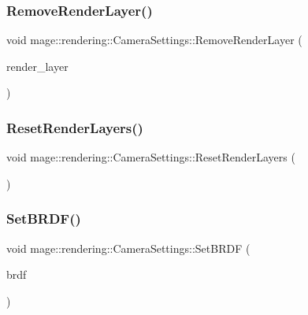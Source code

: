 \subsubsection{\texorpdfstring{Remove\+Render\+Layer()}{RemoveRenderLayer()}}
{\footnotesize\ttfamily void mage\+::rendering\+::\+Camera\+Settings\+::\+Remove\+Render\+Layer (\begin{DoxyParamCaption}\item[{\hyperlink{namespacemage_1_1rendering_a466c2a441ea5b26e4625c2f34e021b3d}{Render\+Layer}}]{render\+\_\+layer }\end{DoxyParamCaption})\hspace{0.3cm}{\ttfamily [noexcept]}}

\hypertarget{classmage_1_1rendering_1_1_camera_settings_a954a0af8d7939069e32b77abc23f95d0}{}\label{classmage_1_1rendering_1_1_camera_settings_a954a0af8d7939069e32b77abc23f95d0} 
\subsubsection{\texorpdfstring{Reset\+Render\+Layers()}{ResetRenderLayers()}}
{\footnotesize\ttfamily void mage\+::rendering\+::\+Camera\+Settings\+::\+Reset\+Render\+Layers (\begin{DoxyParamCaption}{ }\end{DoxyParamCaption})\hspace{0.3cm}{\ttfamily [noexcept]}}

\hypertarget{classmage_1_1rendering_1_1_camera_settings_af2af3e55e876b0e2b037904e221f0bc4}{}\label{classmage_1_1rendering_1_1_camera_settings_af2af3e55e876b0e2b037904e221f0bc4} 
\subsubsection{\texorpdfstring{Set\+B\+R\+D\+F()}{SetBRDF()}}
{\footnotesize\ttfamily void mage\+::rendering\+::\+Camera\+Settings\+::\+Set\+B\+R\+DF (\begin{DoxyParamCaption}\item[{\hyperlink{namespacemage_1_1rendering_ab8fe8684ca4bd74ba3a394b00cf125b5}{B\+R\+DF}}]{brdf }\end{DoxyParamCaption})\hspace{0.3cm}{\ttfamily [noexcept]}}

